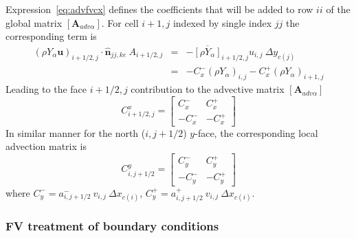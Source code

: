 \documentclass[12pt]{article}
\begin{document}
Expression~\eqref{eq:advfvcx} defines the coefficients that will be added to row $ii$ of the global matrix $\left[ \mathbf{A}_{adv \alpha} \right]$. For cell $i+1,j$ indexed by single index $jj$ the corresponding term is
%
\begin{eqnarray}
  \left( \rho Y_\alpha \mathbf{u} \right)_{i+1/2,j} \cdot \hat{\mathbf{n}}_{jj,ke} \: A_{i+1/2,j} & = & - \overline{\left[ \rho Y_\alpha \right]}_{i+1/2,j} u_{i,j} \: \Delta y_{c(j)} \nonumber \\
  & = & -C^-_x \left( \rho Y_{\alpha} \right)_{i,j} - C^+_x \left( \rho Y_{\alpha} \right)_{i+1,j} \label{eq:advfvcxjj}
\end{eqnarray}
%
Leading to the face ${i+1/2,j}$ contribution to the advective matrix $\left[ \mathbf{A}_{adv \alpha} \right]$
%
\begin{equation}
   C^x_{i+1/2,j} = \left[ \begin{array}{cc} C^-_x & C^+_x \\ -C^-_x & -C^+_x \end{array} \right]
\end{equation}
%
In similar manner for the north ($i,j+1/2$) $y$-face, the corresponding local advection matrix is
%
\begin{equation}
   C^y_{i,j+1/2} = \left[ \begin{array}{cc} C^-_y & C^+_y \\ -C^-_y & -C^+_y \end{array} \right]
\end{equation}
%
where $C^-_y = a^-_{i,j+1/2} \: v_{i,j}  \: \Delta x_{c(i)}$, $C^+_y = a^+_{i,j+1/2} \: v_{i,j}  \: \Delta x_{c(i)}$.


\subsubsection*{FV treatment of boundary conditions} \label{sec:FVBCsCart}

\end{document}
